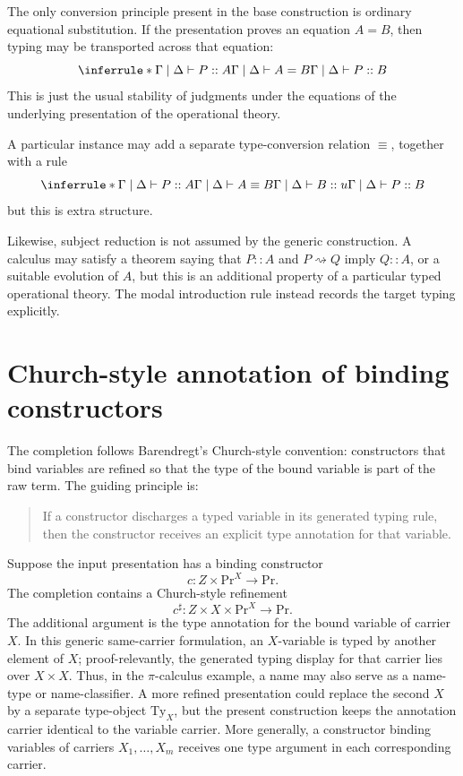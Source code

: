 \documentclass[11pt]{article}
\newcommand{\Proc}{\mathrm{Pr}}
\newcommand{\rw}{\rightsquigarrow}
\newcommand{\ty}{\mathrel{::}}
\begin{document}
The only conversion principle present in the base construction is ordinary equational substitution.  If the presentation proves an equation \(A=B\), then
typing may be transported across that equation:
\[
\inferrule*{
  \Gamma\mid\Delta\vdash P \ty A
  \\
  \Gamma\mid\Delta\vdash A = B
}{
  \Gamma\mid\Delta\vdash P \ty B
}
\]
This is just the usual stability of judgments under the equations of the underlying presentation of the operational theory.

A particular instance may add a separate type-conversion relation \(\equiv\), together with a rule
\[
\inferrule*{
  \Gamma\mid\Delta\vdash P \ty A
  \\
  \Gamma\mid\Delta\vdash A \equiv B
  \\
  \Gamma\mid\Delta\vdash B \ty u
}{
  \Gamma\mid\Delta\vdash P \ty B
}
\]
but this is extra structure.

Likewise, subject reduction is not assumed by the generic construction.  A calculus may satisfy a theorem saying that \(P\ty A\) and \(P\rw Q\) imply \(Q\ty A\), or a suitable evolution of \(A\), but this is an additional property of a particular typed operational theory.  The modal introduction rule instead records the target typing explicitly.

\section{Church-style annotation of binding constructors}

The completion follows Barendregt's Church-style convention: constructors that bind variables are refined so that the type of the bound variable is part of the raw term.  The guiding principle is:
\begin{quote}
If a constructor discharges a typed variable in its generated typing rule, then the constructor receives an explicit type annotation for that variable.
\end{quote}

Suppose the input presentation has a binding constructor
\[
  c:Z\times\Proc^X\to\Proc.
\]
The completion contains a Church-style refinement
\[
  c^{\sharp}:Z\times X\times\Proc^X\to\Proc.
\]
The additional argument is the type annotation for the bound variable of carrier \(X\).  In this generic same-carrier formulation, an \(X\)-variable is typed by another element of \(X\); proof-relevantly, the generated typing display for that carrier lies over \(X\times X\).  Thus, in the \(\pi\)-calculus example, a name may also serve as a name-type or name-classifier.  A more refined presentation could replace the second \(X\) by a separate type-object \(\mathrm{Ty}_X\), but the present construction keeps the annotation carrier identical to the variable carrier. More generally, a constructor binding variables of carriers \(X_1,\ldots,X_m\) receives one type argument in each corresponding carrier.
\end{document}
